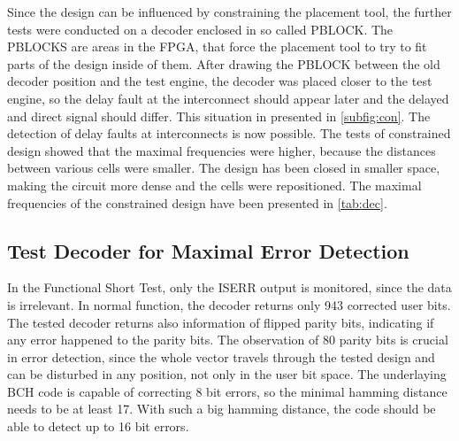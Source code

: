 Since the design can be influenced by constraining the placement tool, the further tests were conducted on a decoder enclosed in so called PBLOCK. The PBLOCKS are areas in the FPGA, that force the placement tool to try to fit parts of the design inside of them. After drawing the PBLOCK between the old decoder position and the test engine, the decoder was placed closer to the test engine, so the delay fault at the interconnect should appear later and the delayed and direct signal should differ. This situation in presented in \autoref{subfig:con}. The detection of delay faults at interconnects is now possible. The tests of constrained design showed that the maximal frequencies were higher, because the distances between various cells were smaller. The design has been closed in smaller space, making the circuit more dense and the cells were repositioned. The maximal frequencies of the constrained design have been presented in \autoref{tab:dec}.

\subsection{Test Decoder for Maximal Error Detection}

In the Functional Short Test, only the ISERR output is monitored, since the data is irrelevant. In normal function, the decoder returns only 943 corrected user bits. The tested decoder returns also information of flipped parity bits, indicating if any error happened to the parity bits. The observation of 80 parity bits is crucial in error detection, since the whole vector travels through the tested design and can be disturbed in any position, not only in the user bit space. The underlaying BCH code is capable of correcting 8 bit errors, so the minimal hamming distance needs to be at least 17. With such a big hamming distance, the code should be able to detect up to 16 bit errors. 

